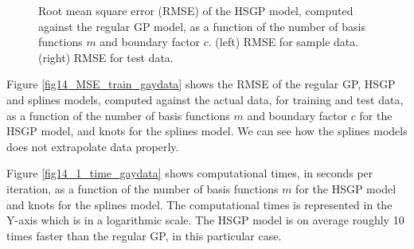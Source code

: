 \documentclass[]{interact}
\theoremstyle{plain}%
\theoremstyle{definition}
\theoremstyle{remark}
\begin{document}
\begin{figure}
\caption{Root mean square error (RMSE) of the HSGP model, computed against the regular GP model, as a function of the number of basis functions $m$ and boundary factor $c$. (left) RMSE for sample data. (right) RMSE for test data.}
  \label{fig13_MSE_train_BF_gaydata}
\end{figure}

Figure \ref{fig14_MSE_train_gaydata} shows the RMSE of the regular GP, HSGP and splines models, computed against the actual data, for training and test data, as a function of the number of basis functions $m$ and boundary factor $c$ for the HSGP model, and  knots for the splines model. We can see how the splines models does not extrapolate data properly. 

Figure \ref{fig14_1_time_gaydata} shows computational times, in seconds per iteration, as a function of the number of basis functions $m$ for the HSGP model and knots for the splines model. The computational times is represented in the Y-axis which is in a logarithmic scale. The HSGP model is on average roughly 10 times faster than the regular GP, in this particular case.
\end{document}
